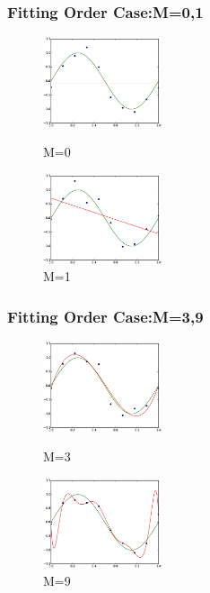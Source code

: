\documentclass[dvipdfmx]{beamer}
\theoremstyle{definition}
\begin{document}
\begin{frame}
  \frametitle{Fitting Order Case:M=0,1}
  \begin{figure}[htb]
    \centering
    \includegraphics[width=3.5cm,clip]{res/fit_m_0.eps}
    \caption{M=0}
    \includegraphics[width=3.5cm,clip]{res/fit_m_1.eps}
    \caption{M=1}
  \end{figure}
\end{frame}

\begin{frame}
  \frametitle{Fitting Order Case:M=3,9}
  \begin{figure}[htb]
    \centering
    \includegraphics[width=3.5cm,clip]{res/fit_m_3.eps}
    \caption{M=3}
    \includegraphics[width=3.5cm,clip]{res/fit_m_9.eps}
    \caption{M=9}
  \end{figure}
\end{frame}
\end{document}

